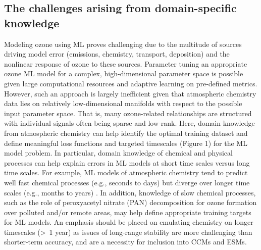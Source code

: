 \documentclass[gmd, manuscript]{copernicus}
\begin{document}
\subsection{The challenges arising from  domain-specific knowledge}
Modeling ozone using ML proves challenging due to the multitude of sources driving model error (emissions, chemistry, transport, deposition) and the nonlinear response of ozone to these sources. Parameter tuning an appropriate ozone ML model for a complex, high-dimensional parameter space is possible given large computational resources and adaptive learning on pre-defined metrics. However, such an approach is largely inefficient given that atmospheric chemistry data lies on relatively low-dimensional manifolds with respect to the possible input parameter space. That is, many ozone-related relationships are structured with individual signals often being sparse and low-rank. Here, domain knowledge from atmospheric chemistry can help identify the optimal training dataset and define meaningful loss functions and targeted timescales (Figure 1) for the ML model problem. In particular, domain knowledge of chemical and physical processes can help explain errors in ML models at short time scales versus long time scales. For example, ML models of atmospheric chemistry tend to predict well fast chemical processes (e.g., seconds to days) but diverge over longer time scales (e.g., months to years) \citep{kelp_toward_2020}. In addition, knowledge of slow chemical processes, such as the role of peroxyacetyl nitrate (PAN) decomposition for ozone formation over polluted and/or remote areas, may help define appropriate training targets for ML models. An emphasis should be placed on emulating chemistry on longer timescales (>~1 year) as issues of long-range stability are more challenging than shorter-term accuracy, and are a necessity for inclusion into CCMs and ESMs. 

\end{document}
